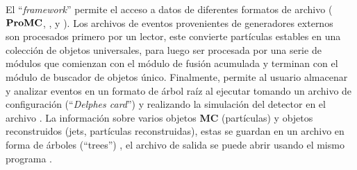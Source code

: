 El ``\textit{framework}''  permite el acceso a datos de diferentes formatos de archivo ($\mathbf{Pro}\-\mathbf{MC}$, ,  y ). Los archivos de eventos provenientes de generadores externos \MC ~ son procesados primero por un lector, este convierte partículas estables en una colección de objetos universales, para luego ser procesada por una serie de módulos que comienzan con el módulo de fusión acumulada y terminan con el módulo de buscador de objetos único. Finalmente,   permite al usuario almacenar y analizar eventos en un formato de árbol raíz al ejecutar   tomando un archivo de configuración (``\textit{Delphes card}'') y realizando la simulación del detector en el archivo . La información sobre varios objetos \textbf{MC} (partículas) y objetos reconstruidos (jets, partículas reconstruidas), estas se guardan en un archivo  en forma de árboles (``trees'')  , el archivo de salida  se puede abrir usando el mismo programa \ROOT.



